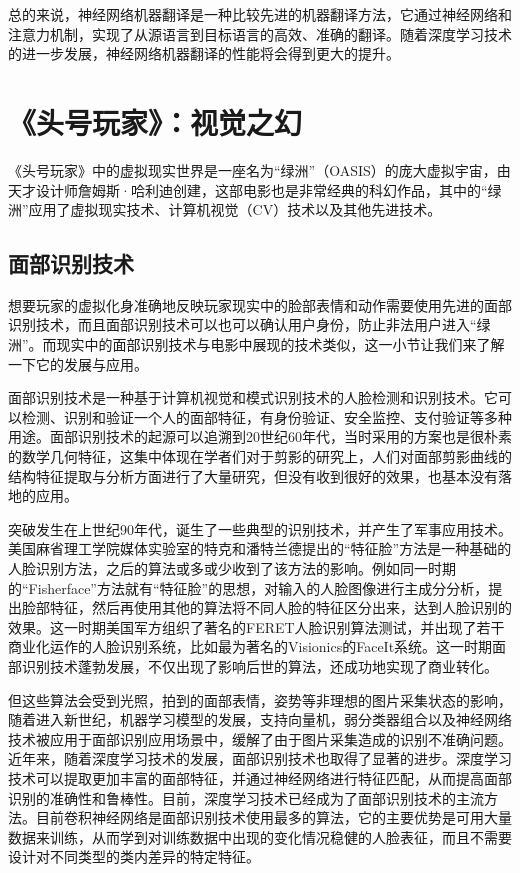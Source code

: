 总的来说，神经网络机器翻译是一种比较先进的机器翻译方法，它通过神经网络和注意力机制，实现了从源语言到目标语言的高效、准确的翻译。随着深度学习技术的进一步发展，神经网络机器翻译的性能将会得到更大的提升。

\section{《头号玩家》：视觉之幻}
《头号玩家》中的虚拟现实世界是一座名为“绿洲”（OASIS）的庞大虚拟宇宙，由天才设计师詹姆斯·哈利迪创建，这部电影也是非常经典的科幻作品，其中的“绿洲”应用了虚拟现实技术、计算机视觉（CV）技术以及其他先进技术。

\subsection{面部识别技术}

想要玩家的虚拟化身准确地反映玩家现实中的脸部表情和动作需要使用先进的面部识别技术，而且面部识别技术可以也可以确认用户身份，防止非法用户进入“绿洲”。而现实中的面部识别技术与电影中展现的技术类似，这一小节让我们来了解一下它的发展与应用。

面部识别技术是一种基于计算机视觉和模式识别技术的人脸检测和识别技术。它可以检测、识别和验证一个人的面部特征，有身份验证、安全监控、支付验证等多种用途。面部识别技术的起源可以追溯到20世纪60年代，当时采用的方案也是很朴素的数学几何特征，这集中体现在学者们对于剪影的研究上，人们对面部剪影曲线的结构特征提取与分析方面进行了大量研究，但没有收到很好的效果，也基本没有落地的应用。

突破发生在上世纪90年代，诞生了一些典型的识别技术，并产生了军事应用技术。美国麻省理工学院媒体实验室的特克和潘特兰德提出的“特征脸”方法是一种基础的人脸识别方法，之后的算法或多或少收到了该方法的影响。例如同一时期的“Fisherface”方法就有“特征脸”的思想，对输入的人脸图像进行主成分分析，提出脸部特征，然后再使用其他的算法将不同人脸的特征区分出来，达到人脸识别的效果。这一时期美国军方组织了著名的FERET人脸识别算法测试，并出现了若干商业化运作的人脸识别系统，比如最为著名的Visionics的FaceIt系统。这一时期面部识别技术蓬勃发展，不仅出现了影响后世的算法，还成功地实现了商业转化。

但这些算法会受到光照，拍到的面部表情，姿势等非理想的图片采集状态的影响，随着进入新世纪，机器学习模型的发展，支持向量机，弱分类器组合以及神经网络技术被应用于面部识别应用场景中，缓解了由于图片采集造成的识别不准确问题。近年来，随着深度学习技术的发展，面部识别技术也取得了显著的进步。深度学习技术可以提取更加丰富的面部特征，并通过神经网络进行特征匹配，从而提高面部识别的准确性和鲁棒性。目前，深度学习技术已经成为了面部识别技术的主流方法。目前卷积神经网络是面部识别技术使用最多的算法，它的主要优势是可用大量数据来训练，从而学到对训练数据中出现的变化情况稳健的人脸表征，而且不需要设计对不同类型的类内差异的特定特征。

